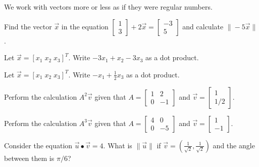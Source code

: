 \documentclass[../main.tex]{subfiles}
\begin{document}
We work with vectors more or less as if they were regular numbers. 

\begin{example}
  Find the vector \(\vec{x}\) in the equation \(\begin{bmatrix} 1 \\ 3 \end{bmatrix} + 2 \vec{x} = \begin{bmatrix} -3 \\ 5 \end{bmatrix}\) and calculate \(\| -5 \vec{x} \|\).

\end{example}

\begin{example}
  Let \(\vec{x} = [ x_{1} \; x_{2} \; x_{3} ]^{T}\).  Write \(-3x_{1} + x_{2} - 3x_{3}\) as a dot product. 

\end{example}

\begin{example}
  Let \(\vec{x} = [ x_{1} \; x_{2} \; x_{3} ]^{T}\).  Write \(- x_{1} + \tfrac{1}{2}x_{3}\) as a dot product. 
  
\end{example}

\begin{example}
  Perform the calculation \(A^{2} \vec{v}\) given that \(A = \begin{bmatrix} 1 & 2 \\ 0 & -1 \end{bmatrix}\) and \(\vec{v} = \begin{bmatrix} 1 \\ 1/2 \end{bmatrix}\).
\end{example}

\begin{example}
  Perform the calculation \(A^{3} \vec{v}\) given that \(A = \begin{bmatrix} 4 & 0 \\ 0 & -5 \end{bmatrix}\) and \(\vec{v} = \begin{bmatrix} 1 \\ -1 \end{bmatrix}\).
\end{example}

\begin{example}
  Consider the equation \(\vec{u} \bullet \vec{v} = 4\). What is \(\|\vec{u}\|\) if \(\vec{v} = \left(\tfrac{1}{\sqrt{2}}, \tfrac{1}{\sqrt{2}}\right)\) and the angle between them is \(\pi/6\)?

\end{example}
\end{document}
